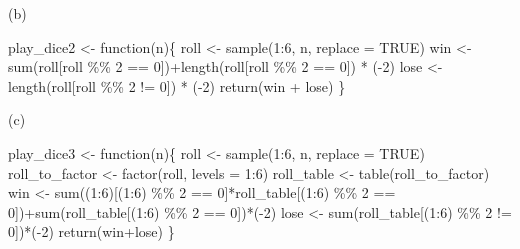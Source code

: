 \documentclass[
  letterpaper,
  DIV=11,
  numbers=noendperiod]{scrartcl}
\newenvironment{Shaded}{\begin{snugshade}}{\end{snugshade}}
\newcommand{\AttributeTok}[1]{\textcolor[rgb]{0.40,0.45,0.13}{#1}}
\newcommand{\ConstantTok}[1]{\textcolor[rgb]{0.56,0.35,0.01}{#1}}
\newcommand{\ControlFlowTok}[1]{\textcolor[rgb]{0.00,0.23,0.31}{#1}}
\newcommand{\DecValTok}[1]{\textcolor[rgb]{0.68,0.00,0.00}{#1}}
\newcommand{\FunctionTok}[1]{\textcolor[rgb]{0.28,0.35,0.67}{#1}}
\newcommand{\NormalTok}[1]{\textcolor[rgb]{0.00,0.23,0.31}{#1}}
\newcommand{\OtherTok}[1]{\textcolor[rgb]{0.00,0.23,0.31}{#1}}
\newcommand{\SpecialCharTok}[1]{\textcolor[rgb]{0.37,0.37,0.37}{#1}}
\begin{document}
(b)

\begin{Shaded}
\begin{Highlighting}[]
\NormalTok{play\_dice2 }\OtherTok{\textless{}{-}} \ControlFlowTok{function}\NormalTok{(n)\{}
\NormalTok{  roll }\OtherTok{\textless{}{-}} \FunctionTok{sample}\NormalTok{(}\DecValTok{1}\SpecialCharTok{:}\DecValTok{6}\NormalTok{, n, }\AttributeTok{replace =} \ConstantTok{TRUE}\NormalTok{)}
\NormalTok{  win }\OtherTok{\textless{}{-}} \FunctionTok{sum}\NormalTok{(roll[roll }\SpecialCharTok{\%\%} \DecValTok{2} \SpecialCharTok{==} \DecValTok{0}\NormalTok{])}\SpecialCharTok{+}\FunctionTok{length}\NormalTok{(roll[roll }\SpecialCharTok{\%\%} \DecValTok{2} \SpecialCharTok{==} \DecValTok{0}\NormalTok{]) }\SpecialCharTok{*}\NormalTok{ (}\SpecialCharTok{{-}}\DecValTok{2}\NormalTok{)}
\NormalTok{  lose }\OtherTok{\textless{}{-}} \FunctionTok{length}\NormalTok{(roll[roll }\SpecialCharTok{\%\%} \DecValTok{2} \SpecialCharTok{!=} \DecValTok{0}\NormalTok{]) }\SpecialCharTok{*}\NormalTok{ (}\SpecialCharTok{{-}}\DecValTok{2}\NormalTok{)}
  \FunctionTok{return}\NormalTok{(win }\SpecialCharTok{+}\NormalTok{ lose)}
\NormalTok{\}}
\end{Highlighting}
\end{Shaded}

(c)

\begin{Shaded}
\begin{Highlighting}[]
\NormalTok{play\_dice3 }\OtherTok{\textless{}{-}} \ControlFlowTok{function}\NormalTok{(n)\{}
\NormalTok{  roll }\OtherTok{\textless{}{-}} \FunctionTok{sample}\NormalTok{(}\DecValTok{1}\SpecialCharTok{:}\DecValTok{6}\NormalTok{, n, }\AttributeTok{replace =} \ConstantTok{TRUE}\NormalTok{)}
\NormalTok{  roll\_to\_factor }\OtherTok{\textless{}{-}} \FunctionTok{factor}\NormalTok{(roll, }\AttributeTok{levels =} \DecValTok{1}\SpecialCharTok{:}\DecValTok{6}\NormalTok{)}
\NormalTok{  roll\_table }\OtherTok{\textless{}{-}} \FunctionTok{table}\NormalTok{(roll\_to\_factor)}
\NormalTok{  win }\OtherTok{\textless{}{-}} \FunctionTok{sum}\NormalTok{((}\DecValTok{1}\SpecialCharTok{:}\DecValTok{6}\NormalTok{)[(}\DecValTok{1}\SpecialCharTok{:}\DecValTok{6}\NormalTok{) }\SpecialCharTok{\%\%} \DecValTok{2} \SpecialCharTok{==} \DecValTok{0}\NormalTok{]}\SpecialCharTok{*}\NormalTok{roll\_table[(}\DecValTok{1}\SpecialCharTok{:}\DecValTok{6}\NormalTok{) }\SpecialCharTok{\%\%} \DecValTok{2} \SpecialCharTok{==} \DecValTok{0}\NormalTok{])}\SpecialCharTok{+}\FunctionTok{sum}\NormalTok{(roll\_table[(}\DecValTok{1}\SpecialCharTok{:}\DecValTok{6}\NormalTok{) }\SpecialCharTok{\%\%} \DecValTok{2} \SpecialCharTok{==} \DecValTok{0}\NormalTok{])}\SpecialCharTok{*}\NormalTok{(}\SpecialCharTok{{-}}\DecValTok{2}\NormalTok{)}
\NormalTok{  lose }\OtherTok{\textless{}{-}} \FunctionTok{sum}\NormalTok{(roll\_table[(}\DecValTok{1}\SpecialCharTok{:}\DecValTok{6}\NormalTok{) }\SpecialCharTok{\%\%} \DecValTok{2} \SpecialCharTok{!=} \DecValTok{0}\NormalTok{])}\SpecialCharTok{*}\NormalTok{(}\SpecialCharTok{{-}}\DecValTok{2}\NormalTok{)}
  \FunctionTok{return}\NormalTok{(win}\SpecialCharTok{+}\NormalTok{lose)            }
\NormalTok{\}}
\end{Highlighting}
\end{Shaded}
\end{document}

